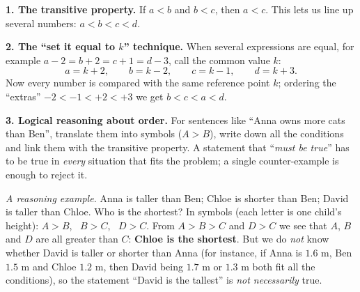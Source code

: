 \begin{knowbox}
\textbf{1. The transitive property.} If $a<b$ and $b<c$, then $a<c$. This lets us line up several numbers: $a<b<c<d$.

\textbf{2. The ``set it equal to $k$'' technique.} When several expressions are equal, for example $a-2=b+2=c+1=d-3$, call the common value $k$:
\[a=k+2,\qquad b=k-2,\qquad c=k-1,\qquad d=k+3.\]
Now every number is compared with the same reference point $k$; ordering the ``extras'' $-2<-1<+2<+3$ we get $b<c<a<d$.
\begin{center}\end{center}

\textbf{3. Logical reasoning about order.} For sentences like ``Anna owns more cats than Ben'', translate them into symbols ($A>B$),
write down all the conditions and link them with the transitive property. A statement that ``\emph{must be true}'' has to be true in
\emph{every} situation that fits the problem; a single counter-example is enough to reject it.
\end{knowbox}

\begin{tipbox}
\emph{A reasoning example.} Anna is taller than Ben; Chloe is shorter than Ben; David is taller than Chloe. Who is the shortest?
In symbols (each letter is one child's height): $A>B$, \ $B>C$, \ $D>C$. From $A>B>C$ and $D>C$ we see that $A$, $B$ and $D$ are all greater than $C$: \textbf{Chloe is the shortest}.
But we do \emph{not} know whether David is taller or shorter than Anna (for instance, if Anna is $1.6$ m, Ben $1.5$ m and Chloe $1.2$ m, then David being $1.7$ m or $1.3$ m both fit all the conditions), so the statement ``David is the tallest'' is \emph{not necessarily} true.
\end{tipbox}

